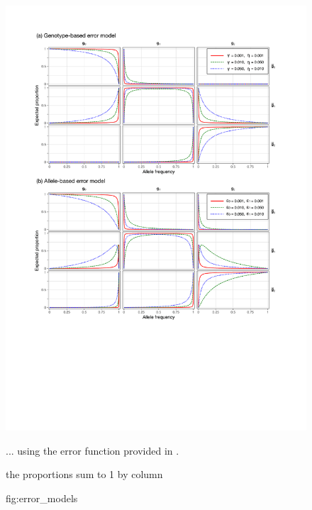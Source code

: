 

\begin{figure}[!htb]
\includegraphics[width=\textwidth]{./img/ch4/error_models}
{
... using the error function provided in .

the proportions sum to 1 by column

\AdditionLabel}
{fig:error_models}
\end{figure}
